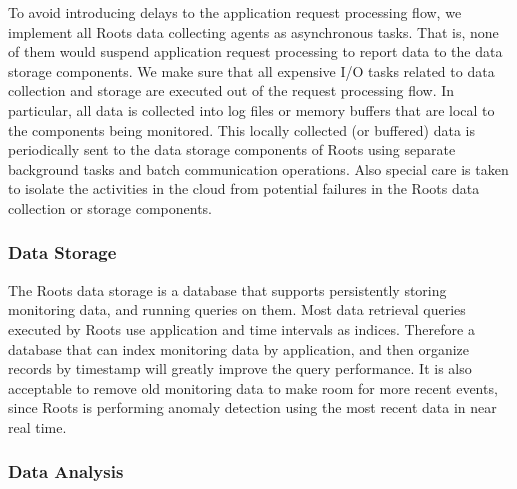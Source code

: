 
To avoid introducing delays to the application request processing flow, we implement
all Roots data collecting agents as asynchronous tasks. That is, none of them would
suspend application request processing to report data to the data storage components.
We make sure that all expensive I/O tasks related to data collection and storage are
executed out of the request processing flow.
In particular, all data is collected into log files or memory buffers that are local to the components being
monitored. This locally collected (or buffered) data is periodically sent
to the data storage components of Roots using separate background tasks and batch communication
operations. Also special care is taken to isolate the activities in the cloud from potential
failures in the Roots data collection or storage components.

\subsubsection{Data Storage}

The Roots data storage is a database that supports persistently storing monitoring data, and running
queries on them.  
Most data retrieval queries executed
by Roots use application and time intervals as indices. Therefore a database that can index monitoring
data by application, and then organize records by timestamp will greatly improve the query performance.
It is also acceptable to remove old monitoring data to make room for more recent events, since Roots
is performing anomaly detection using the most recent data in near real time.

\subsubsection{Data Analysis}

